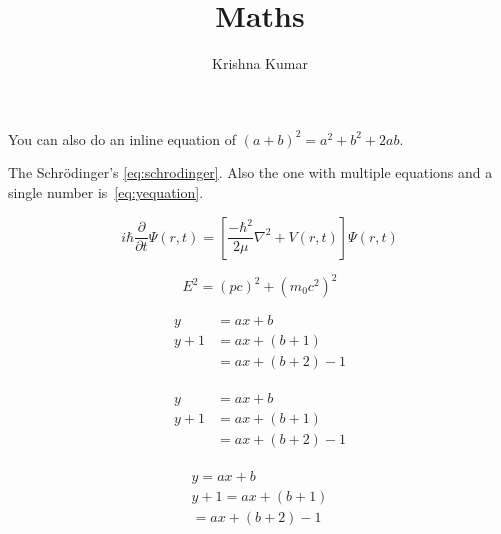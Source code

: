 \documentclass[times]{article}
\title{Maths}
\author{Krishna Kumar}
\date{}
\begin{document}
\maketitle

You can also do an inline equation of $(a+b)^2 = a^2 + b^2 + 2ab$.

The Schr\"{o}dinger's \cref{eq:schrodinger}. Also the one with multiple 
equations and a single number is~\cref{eq:yequation}.

\begin{equation}
i \hbar \frac{\partial}{\partial t} \Psi(r,t) = 
\left[\frac{-\hbar^2}{2\mu}\nabla^2+V(r,t)\right]\Psi(r,t)
\label{eq:schrodinger}
\end{equation}

\begin{equation*}
E^2 = (pc)^2 + (m_0 c^2)^2
\end{equation*}


\begin{align}
	y   & =  ax+b \nonumber\\
	y+1 & = ax+(b+1)\\
	    & = ax+(b+2)-1
\end{align}


\begin{align}
\label{eq:yequation}
\begin{aligned}
	y   & =  ax+b \\
	y+1 & = ax+(b+1)\\
	    & = ax+(b+2)-1
\end{aligned}
\end{align}



\begin{gather}
	y     =  ax+b \nonumber\\
	y+1   =  ax+(b+1)\\
	      =  ax+(b+2)-1
\end{gather}
\end{document}
